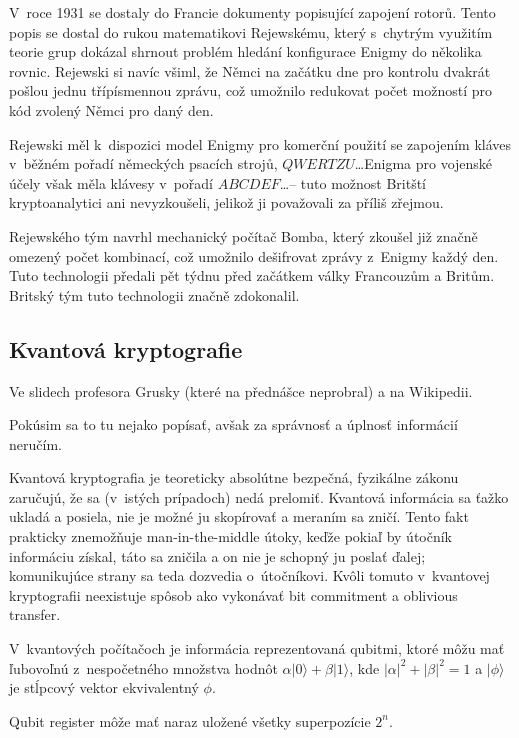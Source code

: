 V~roce 1931 se dostaly do Francie dokumenty popisující zapojení rotorů.
Tento popis se dostal do rukou matematikovi Rejewskému,
který s~chytrým využitím teorie grup dokázal shrnout problém hledání
konfigurace Enigmy do několika rovnic.
Rejewski si navíc všiml, že Němci na začátku dne pro kontrolu dvakrát pošlou jednu
třípísmennou zprávu, což umožnilo redukovat počet možností pro kód
zvolený Němci pro daný den.

Rejewski měl k~dispozici model Enigmy pro komerční použití se zapojením
kláves v~běžném pořadí německých psacích strojů, $QWERTZU$\ldots Enigma
pro vojenské účely však měla klávesy v~pořadí $ABCDEF$\ldots -- tuto
možnost Britští kryptoanalytici ani nevyzkoušeli, jelikož ji považovali
za příliš zřejmou.

Rejewského tým navrhl mechanický počítač Bomba, který zkoušel již značně
omezený počet kombinací, což umožnilo dešifrovat zprávy z~Enigmy každý
den. Tuto technologii předali pět týdnu před začátkem války Francouzům a
Britům. Britský tým tuto technologii značně zdokonalil.

\subsection{Kvantová kryptografie}

Ve slidech profesora Grusky (které na přednášce neprobral)
a na Wikipedii.

Pokúsim sa to tu nejako popísať, avšak za správnosť a úplnosť informácií
neručím.

Kvantová kryptografia je teoreticky absolútne bezpečná, fyzikálne
zákonu zaručujú, že sa (v~istých prípadoch) nedá prelomiť. Kvantová
informácia sa ťažko ukladá a posiela, nie je možné ju skopírovať
a meraním sa zničí. Tento fakt prakticky znemožňuje man-in-the-middle
útoky, keďže pokiaľ by útočník informáciu získal, táto sa zničila
a on nie je schopný ju poslať ďalej; komunikujúce strany sa teda 
dozvedia o~útočníkovi. Kvôli tomuto v~kvantovej kryptografii
neexistuje spôsob ako vykonávať bit commitment a oblivious transfer.

V~kvantových počítačoch je informácia reprezentovaná qubitmi,
ktoré môžu mať ľubovoľnú z~nespočetného množstva hodnôt 
$\alpha|0\rangle + \beta|1\rangle$, kde $|\alpha|^2+|\beta|^2=1$ a 
$|\phi\rangle$ je stĺpcový vektor ekvivalentný $\phi$.

Qubit register môže mať naraz uložené všetky superpozície $2^n$.

